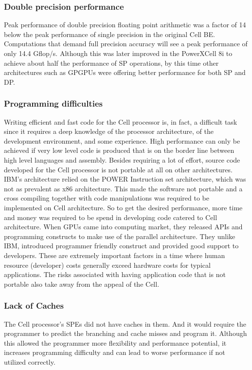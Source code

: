 \documentclass{sig-alternate-05-2015}
\begin{document}
\subsubsection{Double precision performance} 

Peak performance of double precision floating point arithmetic was a factor of 14 below the peak performance of single precision in the original Cell BE. Computations that demand full precision accuracy will see a peak performance of only 14.4 Gflop/s. Although this was later improved in the PowerXCell 8i to achieve about half the performance of SP operations, by this time other architectures such as GPGPUs were offering better performance for both SP and DP.
 
\subsubsection{Programming difficulties}

Writing efficient and fast code for the Cell processor is, in fact, a difficult task since it requires a deep knowledge of the processor architecture, of the development environment, and some experience. High performance can only be achieved if very low level code is produced that is on the border line between high level languages and assembly. Besides requiring a lot of effort, source code developed for the Cell processor is not portable at all on other architectures. IBM’s architecture relied on the POWER Instruction set architecture, which was not as prevalent as x86 architecture. This made the software not portable and a cross compiling together with code manipulations was required to be implemented on Cell architecture. So to get the desired performance, more time and money was required to be spend in developing code catered to Cell architecture. When GPUs came into computing market, they released APIs and programming constructs to make use of the parallel architecture. They unlike IBM, introduced programmer friendly construct and provided good support to developers. These are extremely important factors in a time where human resource (developer) costs generally exceed hardware costs for typical applications. The risks associated with having application code that is not portable also take away from the appeal of the Cell.  

\subsubsection{Lack of Caches} 
The Cell processor’s SPEs did not have caches in them. And it would require the programmer to predict the branching and cache misses and program it. Although this allowed the programmer more flexibility and performance potential, it increases programming difficulty and can lead to worse performance if not utilized correctly. 
\end{document}
